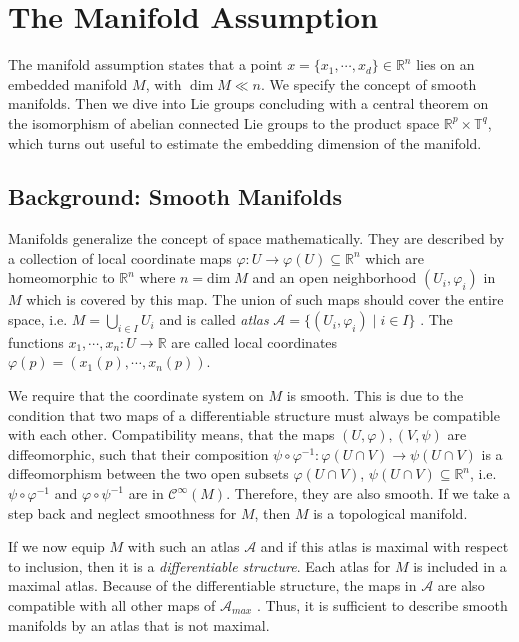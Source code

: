 \documentclass[envcountsect,runningheads]{llncs}
\begin{document}
\section{The Manifold Assumption}
\label{sec:manifoldassumption}
The manifold assumption states that a point $x = \{x_1, \cdots, x_d\} \in \mathbb{R}^n$ lies on an embedded manifold $M$, with $\dim M \ll n$. We specify the concept of smooth manifolds. Then we dive into Lie groups concluding with a central theorem on the isomorphism of abelian connected Lie groups to the product space $\mathbb{R}^p \times \mathbb{T}^q$, which turns out useful to estimate the embedding dimension of the manifold.

\subsection{Background: Smooth Manifolds}
Manifolds generalize the concept of space mathematically. They are described by a collection of local coordinate maps $\varphi: U \rightarrow \varphi(U) \subseteq \mathbb{R}^n$ which are homeomorphic to $\mathbb{R}^{n}$ where $n = \text{dim} \; M$ and an open neighborhood $(U_i,\varphi_i)$ in $M$ which is covered by this map. The union of such maps should cover the entire space, i.e. $M = \bigcup_{i \in I} U_i$ and is called \textit{atlas} $\mathcal{A} = \{(U_i,\varphi_i) \; \vert \; i \in I\}$ . The functions $x_1, \cdots, x_n: U \rightarrow \mathbb{R}$ are called local coordinates $\varphi(p) = (x_1(p), \cdots, x_n(p))$. 

We require that the coordinate system on $M$ is smooth. This is due to the condition that two maps of a differentiable structure must always be compatible with each other. Compatibility means, that the maps $(U,\varphi), (V,\psi)$ are diffeomorphic, such that their composition $\psi \circ \varphi^{-1}:\varphi(U \cap V) \rightarrow \psi(U \cap V)$ is a diffeomorphism between the two open subsets $\varphi(U \cap V)$, $\psi(U \cap V) \subseteq \mathbb{R}^n$, i.e. $\psi \circ \varphi^{-1}$ and $\varphi \circ \psi^{-1}$ are in $\mathcal{C}^\infty(M)$. Therefore, they are also smooth. If we take a step back and neglect smoothness for $M$, then $M$ is a topological manifold. 

If we now equip $M$ with such an atlas $\mathcal{A}$ and if this atlas is maximal with respect to inclusion, then it is a \emph{differentiable structure}. Each atlas for $M$ is included in a maximal atlas. Because of the differentiable structure, the maps in $\mathcal{A}$ are also compatible with all other maps of $\mathcal{A}_{max}$ . Thus, it is sufficient to describe smooth manifolds by an atlas that is not maximal.
\end{document}
